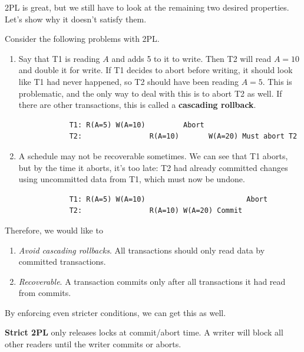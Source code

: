     2PL is great, but we still have to look at the remaining two desired properties. Let's show why it doesn't satisfy them. 

    \begin{example}
      \label{ex:cascading-rollback-and-irrecoverability-in-2pl}
      Consider the following problems with 2PL.  
      \begin{enumerate}
        \item Say that T1 is reading $A$ and adds 5 to it to write. Then T2 will read $A=10$ and double it for write. If T1 decides to abort before writing, it should look like T1 had never happened, so T2 should have been reading $A=5$. This is problematic, and the only way to deal with this is to abort T2 as well. If there are other transactions, this is called a \textbf{cascading rollback}. 
          \begin{lstlisting}
            T1: R(A=5) W(A=10)         Abort 
            T2:                R(A=10)       W(A=20) Must abort T2
          \end{lstlisting}

        \item A schedule may not be recoverable sometimes. We can see that T1 aborts, but by the time it aborts, it's too late: T2 had already committed changes using uncommitted data from T1, which must now be undone. 
          \begin{lstlisting}
            T1: R(A=5) W(A=10)                        Abort
            T2:                R(A=10) W(A=20) Commit
          \end{lstlisting}
      \end{enumerate}
    \end{example}

    Therefore, we would like to 
    \begin{enumerate}
      \item \textit{Avoid cascading rollbacks}. All transactions should only read data by committed transactions. 
      \item \textit{Recoverable}. A transaction commits only after all transactions it had read from commits. 
    \end{enumerate} 
    By enforcing even stricter conditions, we can get this as well. 

    \begin{definition}[Strict 2PL]
      \label{def:strict-2pl}
      \textbf{Strict 2PL} only releases locks at commit/abort time. A writer will block all other readers until the writer commits or aborts.
    \end{definition}

